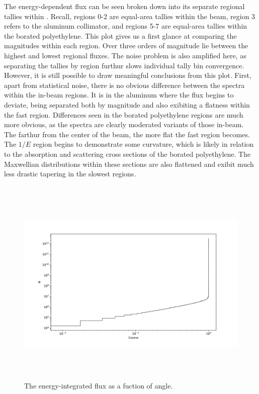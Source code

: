 The energy-dependent flux can be seen broken down into its separate regional tallies within .
Recall, regions 0-2 are equal-area tallies within the beam, region 3 refers to the aluminum collimator, and regions 5-7 are equal-area tallies within the borated polyethylene.
This plot gives us a first glance at comparing the magnitudes within each region.
Over three orders of magnitude lie between the highest and lowest regional fluxes.
The noise problem  is also amplified here, as separating the tallies by region furthur slows individual tally bin convergence.
However, it is still possible to draw meaningful conclusions from this plot.
First, apart from statistical noise, there is no obvious difference between the spectra within the in-beam regions.
It is in the aluminum where the flux begins to deviate, being separated both by magnitude and also exibiting a flatness within the fast region.
Differences seen in the borated polyethylene regions are much more obvious, as the spectra are clearly moderated variants of those in-beam.
The farthur from the center of the beam, the more flat the fast region becomes.
The $1/E$ region begins to demonstrate some curvature, which is likely in relation to the absorption and scattering cross sections of the borated polyethylene.
The Maxwellian distributions within these sections are also flattened and exibit much less drastic tapering in the slowest regions.


%
\begin{figure}[htb]
\centering
\includegraphics[height=4in]{tex/figures/flux_cos.png}
\caption[Flux vs. Angle]{The energy-integrated flux as a fuction of angle.}
\label{fig:flux_cos}
\end{figure}

